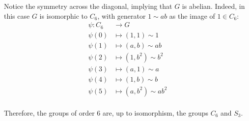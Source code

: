 Notice the symmetry across the diagonal, implying that $G$ is abelian.
Indeed, in this case $G$ is isomorphic to $C_6$,
with generator $1 \sim ab$
as the image of $1 \in C_6$:
\begin{align*}
  \psi \colon C_6 &\to G \\
  \psi(0) &\mapsto (1, 1) \sim 1 \\
  \psi(1) &\mapsto (a, b) \sim ab \\
  \psi(2) &\mapsto (1, b^2) \sim b^2 \\
  \psi(3) &\mapsto (a, 1) \sim a \\
  \psi(4) &\mapsto (1, b) \sim b \\
  \psi(5) &\mapsto (a, b^2) \sim ab^2 \\
\end{align*}

Therefore, the groups of order $6$ are, up to isomorphism, the groups $C_6$ and $S_3$.
